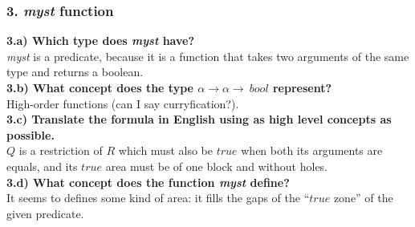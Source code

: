 \documentclass[10pt,a4paper]{article}
\begin{document}
\subsubsection*{3. \textit{myst} function}

\textbf{3.a) Which type does \textit{myst} have?}\\

\textit{myst} is a predicate, because it is a function that takes two arguments of the same type and returns a boolean.\\

\textbf{3.b) What concept does the type $\alpha\rightarrow\alpha\rightarrow~bool$ represent?}\\

High-order functions (can I say curryfication?).\\

\textbf{3.c) Translate the formula in English using as high level concepts as possible.}\\

$Q$ is a restriction of $R$ which must also be $true$ when both its arguments are equals, and its $true$ area must be of one block and without holes.\\

\textbf{3.d) What concept does the function \textit{myst} define?}\\

It seems to defines some kind of area: it fills the gaps of the ``$true$ zone'' of the given predicate.
\end{document}
